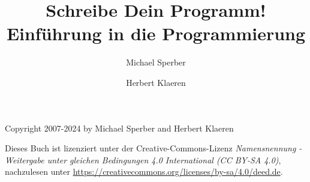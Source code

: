 \documentclass{tup}
\theoremstyle{plain}
\theoremstyle{plain}
\theoremstyle{break}
\begin{document}
\setcounter{tocdepth}{1}
\begin{titlepage}
\title{Schreibe Dein Programm!\\{\large Einführung in die Programmierung}}
\author{Michael Sperber \and Herbert Klaeren}
\maketitle
Copyright \textcopyright{} 2007-2024 by Michael
  Sperber and Herbert Klaeren
  
  Dieses Buch ist lizenziert unter der Creative-Commons-Lizenz
  \textit{Namensnennung - Weitergabe unter gleichen Bedingungen 4.0 International (CC BY-SA 4.0)}, nachzulesen
  unter \url{https://creativecommons.org/licenses/by-sa/4.0/deed.de}.
\end{titlepage}

\thispagestyle{empty}

\tableofcontents

\setcounter{page}{9}
































% 

% 

% 

% 







\renewcommand{\sc}{\bfseries\scshape}



\printindex[variables]
\printindex
\end{document}
